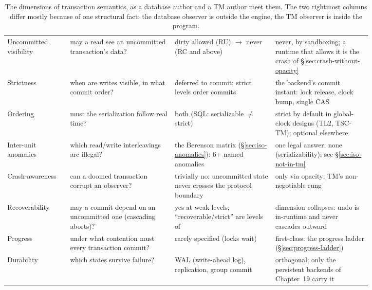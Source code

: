 \begin{table}[htbp]
\centering
\small
\begin{tabular}{M{0.15\linewidth}M{0.25\linewidth}M{0.24\linewidth}M{0.23\linewidth}}
\hline
{} &  &  &  \\
\hline
Uncommitted visibility & may a read see an uncommitted transaction's data? & dirty allowed (RU) $\to$ never (RC and above) & never, by sandboxing; a runtime that allows it is the crash of \S\ref{sec:crash-without-opacity} \\
Strictness & when are writes visible, in what commit order? & deferred to commit; strict levels order commits & the backend's commit instant: lock release, clock bump, single CAS \\
Ordering & must the serialization follow real time? & both (SQL: serializable $\ne$ strict) & strict by default in global-clock designs (TL2, TSC-TM); optional elsewhere \\
Inter-unit anomalies & which read/write interleavings are illegal? & the Berenson matrix (\S\ref{sec:iso-anomalies}): 6+ named anomalies & one legal answer: none (serializability); see \S\ref{sec:iso-not-in-tm} \\
Crash-awareness & can a doomed transaction corrupt an observer? & trivially no: uncommitted state never crosses the protocol boundary & only via opacity; TM's non-negotiable rung \\
Recoverability & may a commit depend on an uncommitted one (cascading aborts)? & yes at weak levels; ``recoverable/strict'' are levels of \cite{gray93tp} & dimension collapses: undo is in-runtime and never cascades outward \\
Progress & under what contention must every transaction commit? & rarely specified (locks wait) & first-class: the progress ladder (\S\ref{sec:progress-ladder}) \\
Durability & which states survive failure? & WAL (write-ahead log), replication, group commit & orthogonal; only the persistent backends of Chapter~19 carry it \\
\hline
\end{tabular}
\caption{The dimensions of transaction semantics, as a database author and a
TM author meet them. The two rightmost columns differ mostly because of one
structural fact: the database observer is outside the engine, the TM observer
is inside the program.}
\label{tab:iso-dimensions}
\end{table}

